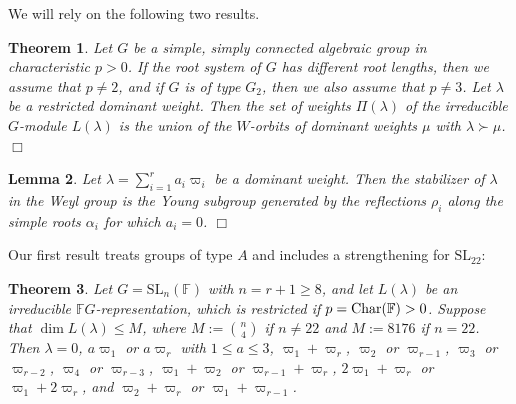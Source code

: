 \documentclass[11pt]{amsart}
\theoremstyle{plain}
\newtheorem{thm}{Theorem}
\newtheorem{lem}[thm]{Lemma}
\theoremstyle{definition}
\numberwithin{thm}{section}
\numberwithin{equation}{thm}
\newcommand{\al}{\alpha}
\newcommand{\om}{\varpi}
\newcommand{\Char}{{\rm char}}
\newcommand{\SL}{\mathrm{SL}}
\newcommand{\F}{{\mathbb F}}
\newcommand{\0}{\emptyset}
\newcommand{\lam}{\lambda}
\renewcommand{\Char}{{\rm Char}}
\begin{document}
We will rely on the following two results.

\begin{thm}\label{premet} {\rm \cite{Pr}}
Let $G$ be a simple, simply connected algebraic group in 
characteristic $p > 0$. If the root system of $G$ has different root 
lengths, then we assume that $p \neq 2$, and if $G$ is of 
type $G_2$, then we 
also assume that $p \neq 3$. Let $\lam$ be a restricted dominant
weight. Then the set of weights $\Pi(\lam)$ of the irreducible $G$-module 
$L(\lam)$ is the union of the $W$-orbits of 
dominant weights $\mu$ with $\lam \succ \mu$.
\hfill $\Box$
\end{thm}

\begin{lem}\label{orb} {\rm \cite[Lemma 10.3B]{H}}
Let $\lam = \sum^r_{i=1}a_i\om_i$ be a dominant weight. Then the 
stabilizer of $\lam$ in the Weyl group is the Young subgroup 
generated by the reflections $\rho_i$ along the simple roots $\al_i$ for which 
$a_i = 0$.
\hfill $\Box$
\end{lem}

Our first result treats groups of type $A$ and includes a strengthening for $\SL_{22}$:

\begin{thm}\label{class-A}
Let $G = \SL_n(\F)$ with $n = r+1 \geq 8$, and let $L(\lam)$ be an  irreducible $\F G$-representation, which is 
restricted if $p = \Char(\F) > 0$. 
Suppose that $\dim L(\lam) \leq M$, where $M:=\binom{n}{4}$ if $n \neq 22$ and $M := 8176$ if $n = 22$.
Then $\lam = 0$, $a\om_1$ or $a\om_r$ with $1 \leq a \leq 3$, $\om_1+\om_r$, $\om_2$ or $\om_{r-1}$, 
$\om_3$ or $\om_{r-2}$, $\om_4$ or $\om_{r-3}$, $\om_1+\om_2$ or
$\om_{r-1}+\om_r$, $2\om_1+\om_r$ or $\om_1+2\om_r$, and $\om_2+\om_r$ or $\om_1+\om_{r-1}$.
\end{thm}
\end{document}

